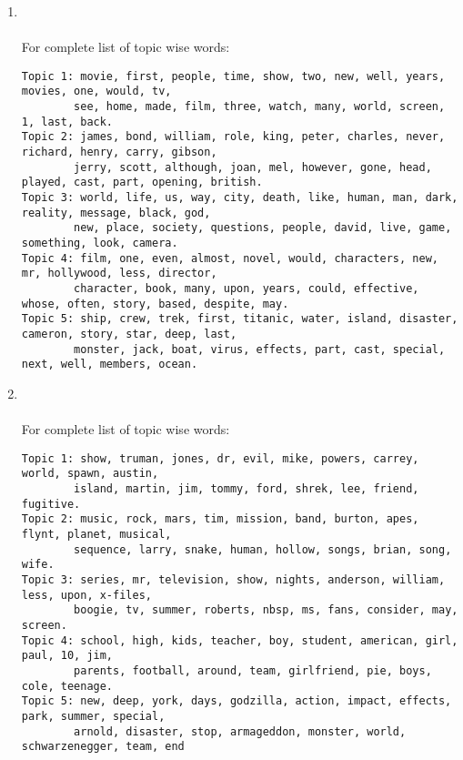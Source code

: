 \documentclass{article}[a4paper]
\begin{document}
\begin{itemize}
\begin{enumerate}
        \item {}\\
         \\
        For complete list of topic wise words: 
\begin{Verbatim}[fontsize=\footnotesize]
Topic 1: movie, first, people, time, show, two, new, well, years, movies, one, would, tv, 
        see, home, made, film, three, watch, many, world, screen, 1, last, back. 
Topic 2: james, bond, william, role, king, peter, charles, never, richard, henry, carry, gibson, 
        jerry, scott, although, joan, mel, however, gone, head, played, cast, part, opening, british. 
Topic 3: world, life, us, way, city, death, like, human, man, dark, reality, message, black, god, 
        new, place, society, questions, people, david, live, game, something, look, camera. 
Topic 4: film, one, even, almost, novel, would, characters, new, mr, hollywood, less, director, 
        character, book, many, upon, years, could, effective, whose, often, story, based, despite, may. 
Topic 5: ship, crew, trek, first, titanic, water, island, disaster, cameron, story, star, deep, last, 
        monster, jack, boat, virus, effects, part, cast, special, next, well, members, ocean. 
\end{Verbatim}
        
        \item {}\\
         \\
        For complete list of topic wise words: 
\begin{Verbatim}[fontsize=\footnotesize]
Topic 1: show, truman, jones, dr, evil, mike, powers, carrey, world, spawn, austin, 
        island, martin, jim, tommy, ford, shrek, lee, friend, fugitive. 
Topic 2: music, rock, mars, tim, mission, band, burton, apes, flynt, planet, musical, 
        sequence, larry, snake, human, hollow, songs, brian, song, wife. 
Topic 3: series, mr, television, show, nights, anderson, william, less, upon, x-files, 
        boogie, tv, summer, roberts, nbsp, ms, fans, consider, may, screen. 
Topic 4: school, high, kids, teacher, boy, student, american, girl, paul, 10, jim, 
        parents, football, around, team, girlfriend, pie, boys, cole, teenage. 
Topic 5: new, deep, york, days, godzilla, action, impact, effects, park, summer, special, 
        arnold, disaster, stop, armageddon, monster, world, schwarzenegger, team, end
\end{Verbatim}
        
    \end{enumerate}


\end{itemize}




\end{document}
